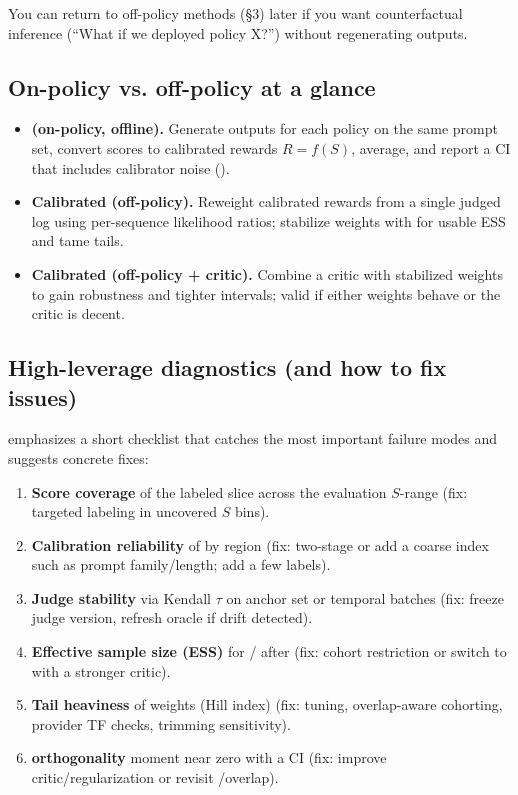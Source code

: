 You can return to off-policy methods (§3) later if you want counterfactual inference (``What if we deployed policy X?'') without regenerating outputs.

\subsection{On-policy vs. off-policy at a glance}

\begin{itemize}
\item \textbf{\dm{} (on-policy, offline).} Generate outputs for each policy on the same prompt set, convert scores to calibrated rewards $R = f(S)$, average, and report a CI that includes calibrator noise (\oua).

\item \textbf{Calibrated \ips{} (off-policy).} Reweight calibrated rewards from a single judged log using per-sequence likelihood ratios; stabilize weights with \simcal{} for usable ESS and tame tails.

\item \textbf{Calibrated \dr{} (off-policy + critic).} Combine a critic with stabilized weights to gain robustness and tighter intervals; valid if either weights behave or the critic is decent.
\end{itemize}

\subsection{High-leverage diagnostics (and how to fix issues)}

\cje{} emphasizes a short checklist that catches the most important failure modes and suggests concrete fixes:

\begin{enumerate}[label=(\alph*)]
\item \textbf{Score coverage} of the labeled slice across the evaluation $S$-range (fix: targeted labeling in uncovered $S$ bins).

\item \textbf{Calibration reliability} of \autocal{} by region (fix: two-stage \autocal{} or add a coarse index such as prompt family/length; add a few labels).

\item \textbf{Judge stability} via Kendall $\tau$ on anchor set or temporal batches (fix: freeze judge version, refresh oracle if drift detected).

\item \textbf{Effective sample size (ESS)} for \ips/\dr{} after \simcal{} (fix: cohort restriction or switch to \dr{} with a stronger critic).

\item \textbf{Tail heaviness} of weights (Hill index) (fix: \simcal{} tuning, overlap-aware cohorting, provider TF checks, trimming sensitivity).

\item \textbf{\dr{} orthogonality} moment near zero with a CI (fix: improve critic/regularization or revisit \simcal/overlap).
\end{enumerate}

